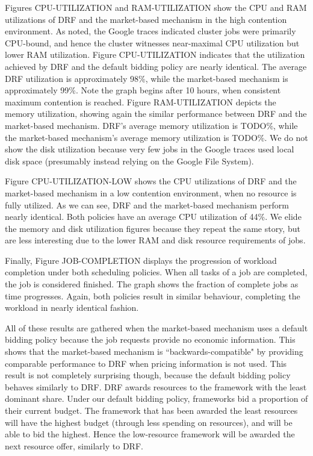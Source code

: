 \documentclass{acm_proc_article-sp}
\begin{document}
Figures CPU-UTILIZATION and RAM-UTILIZATION show the CPU and RAM utilizations of DRF and the market-based mechanism in the high contention environment. As noted, the Google traces indicated cluster jobs were primarily CPU-bound, and hence the cluster witnesses near-maximal CPU utilization but lower RAM utilization. Figure CPU-UTILIZATION indicates that the utilization achieved by DRF and the default bidding policy are nearly identical. The average DRF utilization is approximately 98\%, while the market-based mechanism is approximately 99\%. Note the graph begins after 10 hours, when consistent maximum contention is reached. Figure RAM-UTILIZATION depicts the memory utilization, showing again the similar performance between DRF and the market-based mechanism. DRF's average memory utilization is TODO\%, while the market-based mechanism's average memory utilization is TODO\%. We do not show the disk utilization because very few jobs in the Google traces used local disk space (presumably instead relying on the Google File System).

Figure CPU-UTILIZATION-LOW shows the CPU utilizations of DRF and the market-based mechanism in a low contention environment, when no resource is fully utilized. As we can see, DRF and the market-based mechanism perform nearly identical. Both policies have an average CPU utilization of 44\%. We elide the memory and disk utilization figures because they repeat the same story, but are less interesting due to the lower RAM and disk resource requirements of jobs.

Finally, Figure JOB-COMPLETION displays the progression of workload completion under both scheduling policies. When all tasks of a job are completed, the job is considered finished. The graph shows the fraction of complete jobs as time progresses. Again, both policies result in similar behaviour, completing the workload in nearly identical fashion.

All of these results are gathered when the market-based mechanism uses a default bidding policy because the job requests provide no economic information. This shows that the market-based mechanism is ``backwards-compatible" by providing comparable performance to DRF when pricing information is not used. This result is not completely surprising though, because the default bidding policy behaves similarly to DRF. DRF awards resources to the framework with the least dominant share. Under our default bidding policy, frameworks bid a proportion of their current budget. The framework that has been awarded the least resources will have the highest budget (through less spending on resources), and will be able to bid the highest. Hence the low-resource framework will be awarded the next resource offer, similarly to DRF.
\end{document}
